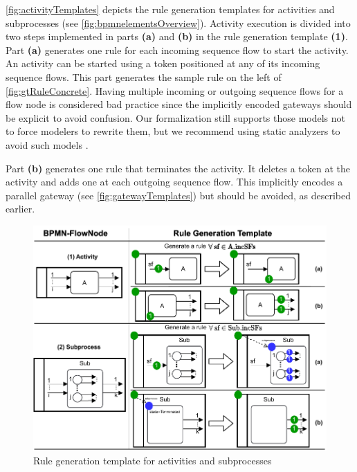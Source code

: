 \documentclass{lmcs} %
\begin{document}
\autoref{fig:activityTemplates} depicts the rule generation templates for activities and subprocesses (see \autoref{fig:bpmnelementsOverview}).
Activity execution is divided into two steps implemented in parts \textbf{(a)} and \textbf{(b)} in the rule generation template \textbf{(1)}.
Part \textbf{(a)} generates one rule for each incoming sequence flow to start the activity.
An activity can be started using a token positioned at any of its incoming sequence flows.
This part generates the sample rule on the left of \autoref{fig:gtRuleConcrete}.
Having multiple incoming or outgoing sequence flows for a flow node is considered bad practice since the implicitly encoded gateways should be explicit to avoid confusion.
Our formalization still supports those models not to force modelers to rewrite them, but we recommend using static analyzers to avoid such models \cite{camundaservicesgmbhBpmnlint2023}.

Part \textbf{(b)} generates one rule that terminates the activity.
It deletes a token at the activity and adds one at each outgoing sequence flow.
This implicitly encodes a parallel gateway (see \autoref{fig:gatewayTemplates}) but should be avoided, as described earlier. 

\begin{figure}[ht]
    \centering
    \includegraphics[width=1\textwidth]{images/activities_template.pdf}
    \caption{Rule generation template for activities and subprocesses}
    \label{fig:activityTemplates}
\end{figure}
\end{document}
